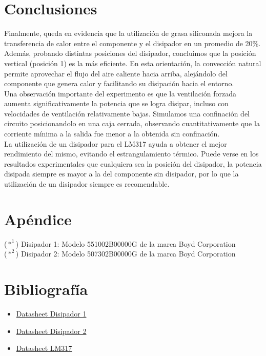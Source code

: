 \documentclass[conference]{IEEEtran}
\begin{document}
    \section{Conclusiones}

    Finalmente, queda en evidencia que la utilización de grasa siliconada mejora la transferencia de calor entre el
    componente y el disipador en un promedio de 20\%. 
    \\Además, probando distintas posiciones del disipador, concluimos que la posición vertical (posición 1) es la más eficiente.
    En esta orientación, la convección natural permite aprovechar el flujo del aire caliente hacia arriba, alejándolo del componente que 
    genera calor y facilitando su disipación hacia el entorno.\\Una observación importante del experimento
    es que la ventilación forzada aumenta significativamente la potencia que se logra disipar, incluso con velocidades de ventilación relativamente bajas.
    Simulamos una confinación del circuito posicionandolo
    en una caja cerrada, observando cuantitativamente que la corriente mínima a la salida fue menor a la obtenida sin confinación.
    \\La utilización de un disipador para el LM317 ayuda a obtener el mejor rendimiento del mismo, evitando el estrangulamiento
    térmico. Puede verse en los resultados
    experimentales que cualquiera sea la posición del disipador, la potencia disipada siempre es mayor a la del
    componente sin disipador, por lo que la utilización de un disipador siempre es recomendable.

    \section{Apéndice}
    ($*^1$) Disipador 1: Modelo 551002B00000G de la marca Boyd Corporation\\
    ($*^2$) Disipador 2: Modelo 507302B00000G de la marca Boyd Corporation \\
    \section{Bibliografía}
    \begin{itemize}
        \item \href{https://www.digikey.com/en/products/detail/aavid-thermal-division-of-boyd-corporation/507302B00000G/5849}{Datasheet Disipador 1}
        \item \href{https://es.farnell.com/boyd/551002b00000g/heat-sink/dp/1339511}{Datasheet Disipador 2}
        \item \href{https://html.alldatasheet.es/html-pdf/1558621/STMICROELECTRONICS/LM317/2265/1/LM317.html}{Datasheet LM317}
    \end{itemize}
\end{document}

